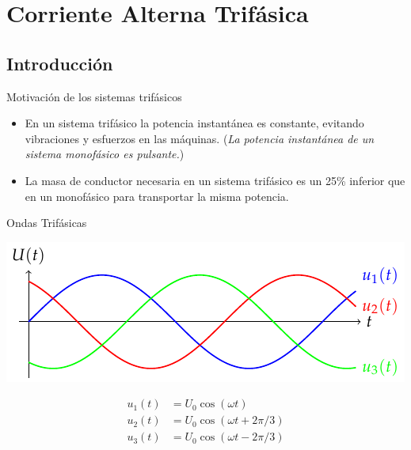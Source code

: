 \documentclass[xcolor={usenames,svgnames,dvipsnames}]{beamer}
\begin{document}
\section{Corriente Alterna Trifásica}
\label{sec:org12ea55a}
\subsection{Introducción}
\label{sec:org9334fd9}
\begin{frame}[label={sec:org8786525}]{Motivación de los sistemas trifásicos}
\begin{itemize}
\item En un sistema trifásico la potencia instantánea es constante, evitando vibraciones y esfuerzos en las máquinas. (\emph{La potencia instantánea de un sistema monofásico es pulsante.})

\item La masa de conductor necesaria en un sistema trifásico es un 25\% inferior que en un monofásico para transportar la misma potencia.
\end{itemize}
\end{frame}

\begin{frame}[label={sec:org2999e34}]{Ondas Trifásicas}
\begin{center}
\includegraphics[width=.9\linewidth]{figs/TensionesTrifasica.pdf}
\end{center}

\begin{align*}
  u_1(t) &= U_0 \cos(\omega t)\\
  u_2(t) &= U_0 \cos(\omega t + 2\pi/3)\\
  u_3(t) &= U_0 \cos(\omega t - 2\pi/3)
\end{align*}
\end{frame}
\end{document}
